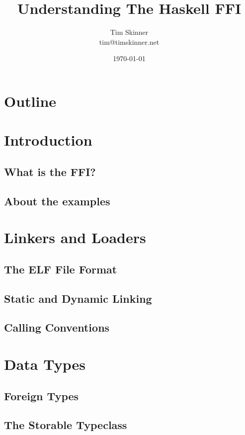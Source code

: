 \documentclass{beamer}
\title{Understanding The Haskell FFI}
\author{Tim Skinner \\ {\small tim@timskinner.net}}
\date{\today}
\begin{document}
\begin{frame}
    \titlepage
\end{frame}

\section*{Outline}
\begin{frame}
    \begin{tiny}
        \tableofcontents
    \end{tiny}
\end{frame}

\section{Introduction}
\subsection{What is the FFI?}
\subsection{About the examples}

\section{Linkers and Loaders}
\subsection{The ELF File Format}
\subsection{Static and Dynamic Linking}
\subsection{Calling Conventions}

\section{Data Types}
\subsection{Foreign Types}
\subsection{The Storable Typeclass}
\end{document}
